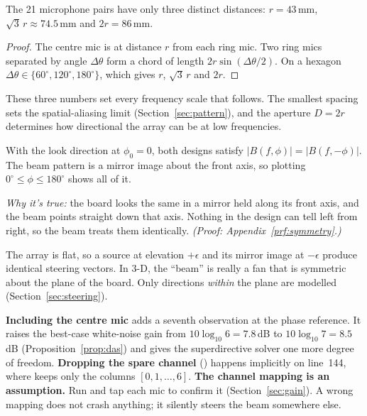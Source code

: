 \documentclass[11pt]{article}
\begin{document}
\begin{proposition}\label{prop:dist}
The 21 microphone pairs have only three distinct distances:
$r=43$\,mm, $\sqrt3\,r\approx74.5$\,mm and $2r=86$\,mm.
\end{proposition}
\begin{proof}
The centre mic is at distance $r$ from each ring mic. Two ring mics separated by angle
$\Delta\theta$ form a chord of length $2r\sin(\Delta\theta/2)$. On a hexagon
$\Delta\theta\in\{60^\circ,120^\circ,180^\circ\}$, which gives $r$, $\sqrt3\,r$ and $2r$.
\end{proof}

These three numbers set every frequency scale that follows. The smallest spacing sets the
spatial-aliasing limit (Section~\ref{sec:pattern}), and the aperture $D=2r$ determines how
directional the array can be at low frequencies.

\begin{proposition}\label{prop:symmetry}
With the look direction at $\phi_0=0$, both designs satisfy $|B(f,\phi)|=|B(f,-\phi)|$.
The beam pattern is a mirror image about the front axis, so plotting
$0^\circ\le\phi\le180^\circ$ shows all of it.
\end{proposition}
\noindent\emph{Why it's true:} the board looks the same in a mirror held along its front axis,
and the beam points straight down that axis. Nothing in the design can tell left from right, so
the beam treats them identically. \emph{(Proof: Appendix~\ref{prf:symmetry}.)}

\begin{remark}
The array is flat, so a source at elevation $+\epsilon$ and its mirror image at $-\epsilon$
produce identical steering vectors. In 3-D, the ``beam'' is really a fan that is symmetric
about the plane of the board. Only directions \emph{within} the plane are modelled
(Section~\ref{sec:steering}).
\end{remark}

\begin{rationale}
\textbf{Including the centre mic} adds a seventh observation at the phase reference. It raises
the best-case white-noise gain from $10\log_{10}6=7.8$\,dB to $10\log_{10}7=8.5$\,dB
(Proposition~\ref{prop:das}) and gives the superdirective solver one more degree of freedom.
\textbf{Dropping the spare channel} () happens implicitly on line~144,
where  keeps only the columns $[0,1,\dots,6]$.
\textbf{The channel mapping is an assumption.} Run  and tap each mic to confirm
it (Section~\ref{sec:gain}). A wrong mapping does not crash anything; it silently steers the
beam somewhere else.
\end{rationale}
\end{document}
